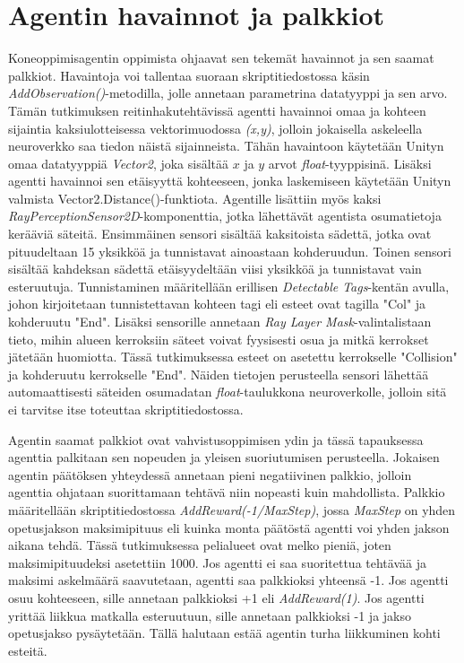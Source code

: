 \documentclass[utf8]{gradu3}
\begin{document}
\section{Agentin havainnot ja palkkiot}

Koneoppimisagentin oppimista ohjaavat sen tekemät havainnot ja sen saamat palkkiot. Havaintoja voi tallentaa suoraan skriptitiedostossa käsin \textit{AddObservation()}-metodilla, jolle annetaan parametrina datatyyppi ja sen arvo. Tämän tutkimuksen reitinhakutehtävissä agentti havainnoi omaa ja kohteen sijaintia kaksiulotteisessa vektorimuodossa \textit{(x,y)}, jolloin jokaisella askeleella neuroverkko saa tiedon näistä sijainneista. Tähän havaintoon käytetään Unityn omaa datatyyppiä \textit{Vector2}, joka sisältää \(x\) ja \(y\) arvot \textit{float}-tyyppisinä. Lisäksi agentti havainnoi sen etäisyyttä kohteeseen, jonka laskemiseen käytetään Unityn valmista Vector2.Distance()-funktiota. Agentille lisättiin myös kaksi \textit{RayPerceptionSensor2D}-komponenttia, jotka lähettävät agentista osumatietoja kerääviä säteitä. Ensimmäinen sensori sisältää kaksitoista sädettä, jotka ovat pituudeltaan 15 yksikköä ja tunnistavat ainoastaan kohderuudun. Toinen sensori sisältää kahdeksan sädettä etäisyydeltään viisi yksikköä ja tunnistavat vain esteruutuja. Tunnistaminen määritellään erillisen \textit{Detectable Tags}-kentän avulla, johon kirjoitetaan tunnistettavan kohteen tagi eli esteet ovat tagilla "Col" ja kohderuutu "End". Lisäksi sensorille annetaan \textit{Ray Layer Mask}-valintalistaan tieto, mihin alueen kerroksiin säteet voivat fyysisesti osua ja mitkä kerrokset jätetään huomiotta. Tässä tutkimuksessa esteet on asetettu kerrokselle "Collision" ja kohderuutu kerrokselle "End". Näiden tietojen perusteella sensori lähettää automaattisesti säteiden osumadatan \textit{float}-taulukkona neuroverkolle, jolloin sitä ei tarvitse itse toteuttaa skriptitiedostossa.

Agentin saamat palkkiot ovat vahvistusoppimisen ydin ja tässä tapauksessa agenttia palkitaan sen nopeuden ja yleisen suoriutumisen perusteella. Jokaisen agentin päätöksen yhteydessä annetaan pieni negatiivinen palkkio, jolloin agenttia ohjataan suorittamaan tehtävä niin nopeasti kuin mahdollista. Palkkio määritellään skriptitiedostossa \textit{AddReward(-1/MaxStep)}, jossa \textit{MaxStep} on yhden opetusjakson maksimipituus eli kuinka monta päätöstä agentti voi yhden jakson aikana tehdä. Tässä tutkimuksessa pelialueet ovat melko pieniä, joten maksimipituudeksi asetettiin 1000. Jos agentti ei saa suoritettua tehtävää ja maksimi askelmäärä saavutetaan, agentti saa palkkioksi yhteensä -1. Jos agentti osuu kohteeseen, sille annetaan palkkioksi +1 eli \textit{AddReward(1)}. Jos agentti yrittää liikkua matkalla esteruutuun, sille annetaan palkkioksi -1 ja jakso opetusjakso pysäytetään. Tällä halutaan estää agentin turha liikkuminen kohti esteitä.
\end{document}
